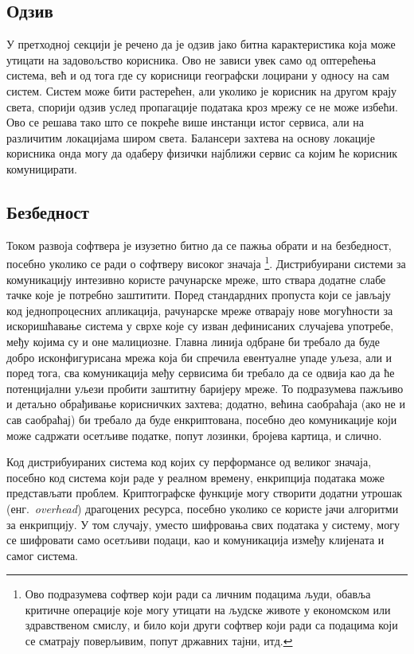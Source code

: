 \documentclass[12pt,oneside]{memoir}
\begin{document}
\subsection{Одзив}
У претходној секцији је речено да је одзив јако битна карактеристика која може утицати на задовољство корисника. Ово не зависи увек само од оптерећења система, већ и од тога где су корисници географски лоцирани у односу на сам систем. Систем може бити растерећен, али уколико је корисник на другом крају света, спорији одзив услед пропагације података кроз мрежу се не може избећи. Ово се решава тако што се покреће више инстанци истог сервиса, али на различитим локацијама широм света. Балансери захтева на основу локације корисника онда могу да одаберу физички најближи сервис са којим ће корисник комуницирати.

\subsection{Безбедност}
Током развоја софтвера је изузетно битно да се пажња обрати и на безбедност, посебно уколико се ради о софтверу високог значаја \footnote{Ово подразумева софтвер који ради са личним подацима људи, обавља критичне операције које могу утицати на људске животе у економском или здравственом смислу, и било који други софтвер који ради са подацима који се сматрају поверљивим, попут државних тајни, итд.}. Дистрибуирани системи за комуникацију интезивно користе рачунарске мреже, што ствара додатне слабе тачке које је потребно заштитити. Поред стандардних пропуста који се јављају код једнопроцесних апликација, рачунарске мреже отварају нове могућности за искоришћавање система у сврхе које су изван дефинисаних случајева употребе, међу којима су и оне малициозне. Главна линија одбране би требало да буде добро исконфигурисана мрежа која би спречила евентуалне упаде уљеза, али и поред тога, сва комуникација међу сервисима би требало да се одвија као да ће потенцијални уљези пробити заштитну баријеру мреже. То подразумева пажљиво и детаљно обрађивање корисничких захтева; додатно, већина саобраћаја (ако не и сав саобраћај) би требало да буде енкриптована, посебно део комуникације који може садржати осетљиве податке, попут лозинки, бројева картица, и слично.

Код дистрибуираних система код којих су перформансе од великог значаја, посебно код система који раде у реалном времену, енкрипција података може представљати проблем. Криптографске функције могу створити додатни утрошак (енг.~\textit{overhead}) драгоцених ресурса, посебно уколико се користе јачи алгоритми за енкрипцију. У том случају, уместо шифровања свих података у систему, могу се шифровати само осетљиви подаци, као и комуникација између клијената и самог система.
\end{document}
